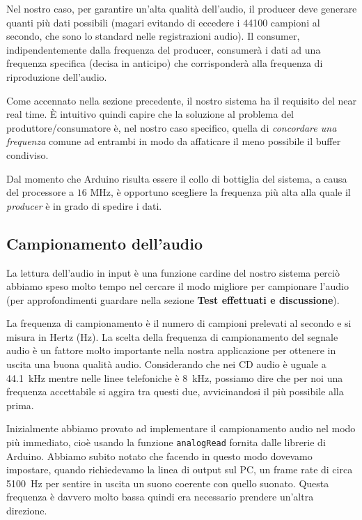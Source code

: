 \documentclass[a4paper,11pt]{article}
\begin{document}
Nel nostro caso, per garantire un'alta qualità dell'audio, il producer deve generare quanti più dati possibili (magari evitando di eccedere i \num{44100} campioni al secondo, che sono lo standard nelle registrazioni audio). Il consumer, indipendentemente dalla frequenza del producer, consumerà i dati ad una frequenza specifica (decisa in anticipo) che corrisponderà alla frequenza di riproduzione dell'audio.

Come accennato nella sezione precedente, il nostro sistema ha il requisito del near real time. È intuitivo quindi capire che la soluzione al problema del produttore/consumatore è, nel nostro caso specifico, quella di \textit{concordare una frequenza} comune ad entrambi in modo da affaticare il meno possibile il buffer condiviso.

Dal momento che Arduino risulta essere il collo di bottiglia del sistema, a causa del processore a $16$ MHz, è opportuno scegliere la frequenza più alta alla quale il \textit{producer} è in grado di spedire i dati.

\subsection{Campionamento dell'audio}
La lettura dell'audio in input è una funzione cardine del nostro sistema perciò abbiamo speso molto tempo nel cercare il modo migliore per campionare l'audio (per approfondimenti guardare nella sezione \textbf{Test effettuati e discussione}).

La frequenza di campionamento è il numero di campioni prelevati al secondo e si misura in Hertz (\si{\hertz}).
La scelta della frequenza di campionamento del segnale audio è un fattore molto importante nella nostra applicazione per ottenere in uscita una buona qualità audio. Considerando che nei CD audio è uguale a \SI{44.1}{\kilo\hertz} mentre nelle linee telefoniche è \SI{8}{\kilo\hertz}, possiamo dire che per noi una frequenza accettabile si aggira tra questi due, avvicinandosi il più possibile alla prima.

Inizialmente abbiamo provato ad implementare il campionamento audio nel modo più immediato, cioè usando la funzione \texttt{analogRead} fornita dalle librerie di Arduino.
Abbiamo subito notato che facendo in questo modo dovevamo impostare, quando richiedevamo la linea di output sul PC, un frame rate di circa \SI{5100}{\hertz} per sentire in uscita un suono coerente con quello suonato. Questa frequenza è davvero molto bassa quindi era necessario prendere un'altra direzione.
\end{document}
